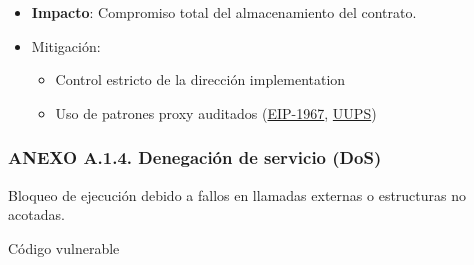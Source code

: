 \begin{Shaded}
\begin{Highlighting}[]
\NormalTok{ \{}

\OperatorTok{;}

     \NormalTok{ \{}

\FunctionTok{       }\OperatorTok{,}\NormalTok{ ) }\OperatorTok{=}\OperatorTok{;}

        \OperatorTok{;}

\NormalTok{    \}}

\NormalTok{\}}
\end{Highlighting}
\end{Shaded}

\begin{itemize}
\tightlist
\item
  \textbf{Impacto}: Compromiso total del almacenamiento del contrato.
\item
  Mitigación:

  \begin{itemize}
  \tightlist
  \item
    Control estricto de la dirección implementation
  \item
    Uso de patrones proxy auditados
    (\href{https://eips.ethereum.org/EIPS/eip-1967}{EIP-1967},
    \href{https://docs.openzeppelin.com/contracts-stylus/uups-proxy}{UUPS})
  \end{itemize}
\end{itemize}

\subsubsection{ANEXO A.1.4. Denegación de servicio
(DoS)}\label{anexo-a.1.4.-denegaciuxf3n-de-servicio-dos}

Bloqueo de ejecución debido a fallos en llamadas externas o estructuras
no acotadas.

Código vulnerable

\begin{Shaded}
\begin{Highlighting}[]
 \NormalTok{ \{}

    \OperatorTok{=} \OperatorTok{;}\OperatorTok{\textless{}}\OperatorTok{;}\OperatorTok{++}\NormalTok{) \{}

        \NormalTok{(}\OperatorTok{;}

\NormalTok{    \}}

\NormalTok{\}}
\end{Highlighting}
\end{Shaded}

